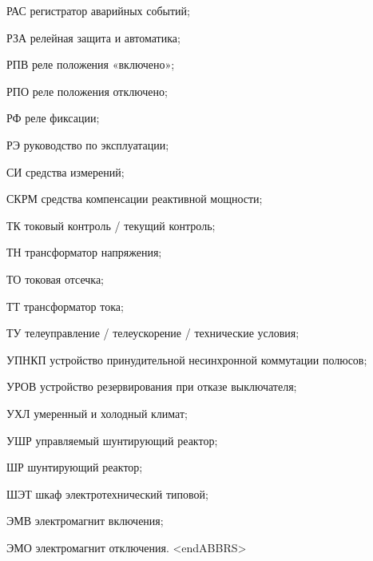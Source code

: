 \begin{list}{}
\item[РАС] регистратор аварийных событий;
\item[РЗА] релейная защита и автоматика;
\item[РПВ] реле положения «включено»;
\item[РПО] реле положения отключено;
\item[РФ] реле фиксации;
\item[РЭ] руководство по эксплуатации;
\item[СИ] средства измерений;
\item[СКРМ] средства компенсации реактивной мощности;
\item[ТК] токовый контроль / текущий контроль;
\item[ТН] трансформатор напряжения;
\item[ТО] токовая отсечка;
\item[ТТ] трансформатор тока;
\item[ТУ] телеуправление / телеускорение / технические условия;
\item[УПНКП] устройство принудительной несинхронной коммутации полюсов;
\item[УРОВ] устройство резервирования при отказе выключателя;
\item[УХЛ] умеренный и холодный климат;
\item[УШР] управляемый шунтирующий реактор;
\item[ШР] шунтирующий реактор;
\item[ШЭТ] шкаф электротехнический типовой;
\item[ЭМВ] электромагнит включения;
\item[ЭМО] электромагнит отключения.
{\color{white}\fontsize{0.1pt}{0.1pt}\selectfont<endABBRS>}
\end{list}
